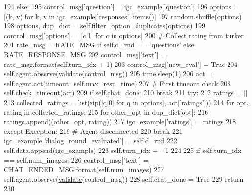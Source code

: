 \begin{DoxyCode}
194             \textcolor{keywordflow}{else}:
195                 control\_msg[\textcolor{stringliteral}{'question'}] = igc\_example[\textcolor{stringliteral}{'question'}]
196                 options = [(k, v) \textcolor{keywordflow}{for} k, v \textcolor{keywordflow}{in} igc\_example[\textcolor{stringliteral}{'responses'}].items()]
197             random.shuffle(options)
198             options, dup\_dict = self.filter\_option\_duplicates(options)
199             control\_msg[\textcolor{stringliteral}{'options'}] = [c[1] \textcolor{keywordflow}{for} c \textcolor{keywordflow}{in} options]
200             \textcolor{comment}{# Collect rating from turker}
201             rate\_msg = RATE\_MSG \textcolor{keywordflow}{if} self.d\_rnd == \textcolor{stringliteral}{'questions'} \textcolor{keywordflow}{else} RATE\_RESPONSE\_MSG
202             control\_msg[\textcolor{stringliteral}{'text'}] = rate\_msg.format(self.turn\_idx + 1)
203             control\_msg[\textcolor{stringliteral}{'new\_eval'}] = \textcolor{keyword}{True}
204             self.agent.observe(\hyperlink{namespaceparlai_1_1core_1_1worlds_afc3fad603b7bce41dbdc9cdc04a9c794}{validate}(control\_msg))
205             time.sleep(1)
206             act = self.agent.act(timeout=self.max\_resp\_time)
207             \textcolor{comment}{# First timeout check}
208             self.check\_timeout(act)
209             \textcolor{keywordflow}{if} self.chat\_done:
210                 \textcolor{keywordflow}{break}
211             \textcolor{keywordflow}{try}:
212                 ratings = []
213                 collected\_ratings = list(zip([q[0] \textcolor{keywordflow}{for} q \textcolor{keywordflow}{in} options], act[\textcolor{stringliteral}{'ratings'}]))
214                 \textcolor{keywordflow}{for} opt, rating \textcolor{keywordflow}{in} collected\_ratings:
215                     \textcolor{keywordflow}{for} other\_opt \textcolor{keywordflow}{in} dup\_dict[opt]:
216                         ratings.append((other\_opt, rating))
217                 igc\_example[\textcolor{stringliteral}{'ratings'}] = ratings
218             \textcolor{keywordflow}{except} Exception:
219                 \textcolor{comment}{# Agent disconnected}
220                 \textcolor{keywordflow}{break}
221             igc\_example[\textcolor{stringliteral}{'dialog\_round\_evaluated'}] = self.d\_rnd
222             self.data.append(igc\_example)
223             self.turn\_idx += 1
224 
225         \textcolor{keywordflow}{if} self.turn\_idx == self.num\_images:
226             control\_msg[\textcolor{stringliteral}{'text'}] = CHAT\_ENDED\_MSG.format(self.num\_images)
227             self.agent.observe(\hyperlink{namespaceparlai_1_1core_1_1worlds_afc3fad603b7bce41dbdc9cdc04a9c794}{validate}(control\_msg))
228         self.chat\_done = \textcolor{keyword}{True}
229         \textcolor{keywordflow}{return}
230 
\end{DoxyCode}
